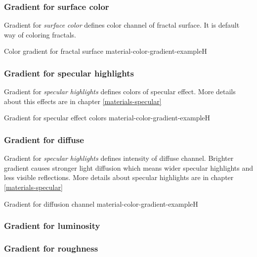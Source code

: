 \subsubsection{Gradient for surface color}\label{materials-surface_color-gradient}

Gradient for \emph{surface color} defines color channel of fractal surface. It is default way of coloring fractals.

{Color gradient for fractal surface}
{material-color-gradient-example}{H}

\subsubsection{Gradient for specular highlights}\label{materials-specular-gradient}

Gradient for \emph{specular highlights} defines colors of specular effect. More details about this effects are in chapter \ref{materials-specular}

{Gradient for specular effect colors}
{material-color-gradient-example}{H}

\subsubsection{Gradient for diffuse}\label{materials-diffuse-gradient}

Gradient for \emph{specular highlights} defines intensity of diffuse channel. Brighter gradient causes stronger light diffusion which means wider specular highlights and less visible reflections. More details about specular highlights are in chapter \ref{materials-specular}

{Gradient for diffusion channel}
{material-color-gradient-example}{H}

\subsubsection{Gradient for luminosity}\label{materials-luminosity-gradient}

\subsubsection{Gradient for roughness}\label{materials-roughness-gradient}

